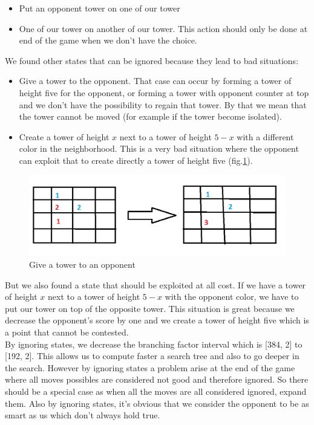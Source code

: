 \documentclass[10pt,a4paper]{article}
\begin{document}
\begin{itemize}
\item Put an opponent tower on one of our tower
\item One of our tower on another of our tower. This action should only be done at end of the game when we don't have the choice.
\end{itemize}

We found other states that can be ignored because they lead to bad situations:

\begin{itemize}
\item Give a tower to the opponent. That case can occur by forming a tower of height five for the opponent, or forming a tower with opponent counter at top and we don't have the possibility to regain that tower. By that we mean that the tower cannot be moved (for example if the tower become isolated).
\item Create a tower of height $x$ next to a tower of height $5-x$ with a different color in the neighborhood. This is a very bad situation where the opponent can exploit that to create directly a tower of height five (fig.\ref{states_ignored}). 
\end{itemize}

\begin{figure}[h]
\center
\includegraphics[scale=0.4]{img/states_ignored.png} 
\caption{\label{states_ignored} Give a tower to an opponent}
\end{figure}

But we also found a state that should be exploited at all cost. If we have a tower of height $x$ next to a tower of height $5-x$ with the opponent color, we have to put our tower on top of the opposite tower. This situation is great because we decrease the opponent's score by one and we create a tower of height five which is a point that cannot be contested. \\

By ignoring states, we decrease the branching factor interval which is [384, 2] to [192, 2]. This allows us to compute faster a search tree and also to go deeper in the search. However by ignoring states a problem arise at the end of the game where all moves possibles are considered not good and therefore ignored. So there should be a special case as when all the moves are all considered ignored, expand them. Also by ignoring states, it's obvious that we consider the opponent to be as smart as us which don't always hold true. 
\end{document}
